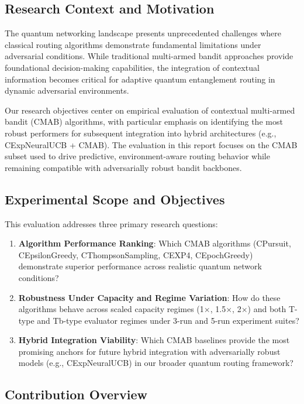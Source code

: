 \documentclass[12pt,a4paper]{article}
\begin{document}
\subsection{Research Context and Motivation}

The quantum networking landscape presents unprecedented challenges where classical routing algorithms demonstrate fundamental limitations under adversarial conditions. While traditional multi-armed bandit approaches provide foundational decision-making capabilities, the integration of contextual information becomes critical for adaptive quantum entanglement routing in dynamic adversarial environments.

Our research objectives center on empirical evaluation of contextual multi-armed bandit (CMAB) algorithms, with particular emphasis on identifying the most robust performers for subsequent integration into hybrid architectures (e.g., CExpNeuralUCB + CMAB). The evaluation in this report focuses on the CMAB subset used to drive predictive, environment-aware routing behavior while remaining compatible with adversarially robust bandit backbones.

\subsection{Experimental Scope and Objectives}

This evaluation addresses three primary research questions:

\begin{enumerate}
\item \textbf{Algorithm Performance Ranking}: Which CMAB algorithms (CPursuit, CEpsilonGreedy, CThompsonSampling, CEXP4, CEpochGreedy) demonstrate superior performance across realistic quantum network conditions?
\item \textbf{Robustness Under Capacity and Regime Variation}: How do these algorithms behave across scaled capacity regimes (1$\times$, 1.5$\times$, 2$\times$) and both T-type and Tb-type evaluator regimes under 3-run and 5-run experiment suites?
\item \textbf{Hybrid Integration Viability}: Which CMAB baselines provide the most promising anchors for future hybrid integration with adversarially robust models (e.g., CExpNeuralUCB) in our broader quantum routing framework?
\end{enumerate}

\subsection{Contribution Overview}
\end{document}
